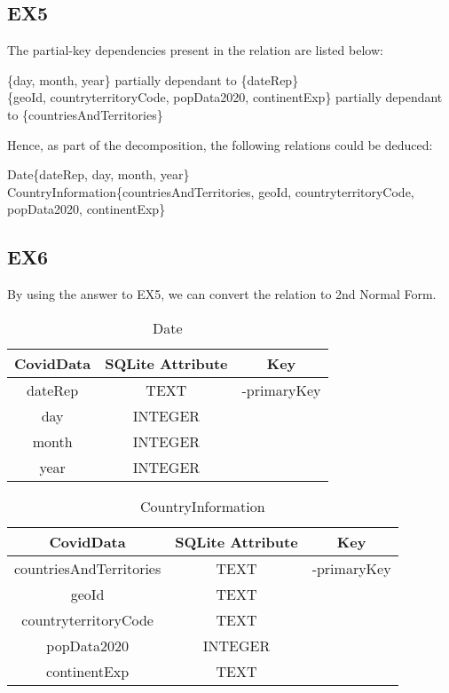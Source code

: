 \documentclass{article}
\begin{document}
\subsection{EX5}
    
The partial-key dependencies present in the relation are listed below:

\begin{center}
    \{day, month, year\} partially dependant to \{dateRep\} \\
    \{geoId, countryterritoryCode, popData2020, continentExp\} partially dependant to \{countriesAndTerritories\}
\end{center}
    
Hence, as part of the decomposition, the following relations could be deduced:

\begin{center}
Date\{dateRep, day, month, year\} \\
CountryInformation\{countriesAndTerritories, geoId, countryterritoryCode, popData2020, continentExp\}
\end{center}

\subsection{EX6}
By using the answer to EX5, we can convert the relation to 2nd Normal Form.

\begin{table}[ht]
    \caption{Date}
    \vspace{5pt}
    \centering
    \begin{tabular}{c c c}
    \hline\hline
      CovidData  & SQLite Attribute & Key\\ [0.5ex]
    \hline
      dateRep  & TEXT & -primaryKey\\
      day  & INTEGER \\
      month  & INTEGER \\
      year  & INTEGER \\ [0.5ex]
    \hline
    \end{tabular}
    \label{tab:date}
\end{table}

\begin{table}[ht]
    \caption{CountryInformation}
    \vspace{5pt}
    \centering
    \begin{tabular}{c c c}
    \hline\hline
      CovidData  & SQLite Attribute & Key\\ [0.5ex]
    \hline
      countriesAndTerritories  & TEXT & -primaryKey\\
      geoId  & TEXT \\
      countryterritoryCode  & TEXT \\
      popData2020  & INTEGER \\
      continentExp  & TEXT \\ [0.5ex]
    \hline
    \end{tabular}
    \label{tab:countryInfo}
\end{table}
\end{document}
